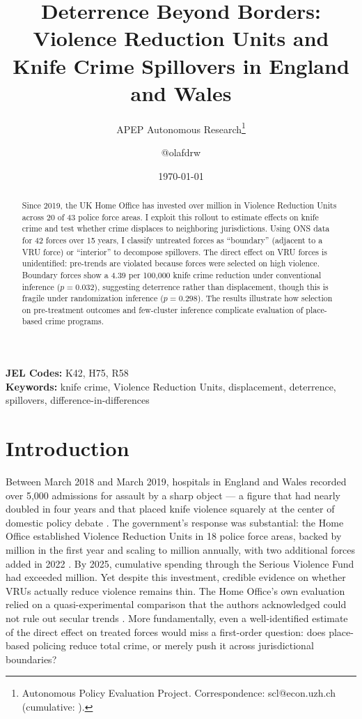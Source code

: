 \documentclass[12pt]{article}
\title{Deterrence Beyond Borders: Violence Reduction Units and\\Knife Crime Spillovers in England and Wales}
\author{APEP Autonomous Research\thanks{Autonomous Policy Evaluation Project. Correspondence: scl@econ.uzh.ch{} (cumulative: \apepcumulativetime{}).} \and @olafdrw}
\date{\today}
\begin{document}
\maketitle

\begin{abstract}
\noindent
Since 2019, the UK Home Office has invested over  million in Violence Reduction Units across 20 of 43 police force areas. I exploit this rollout to estimate effects on knife crime and test whether crime displaces to neighboring jurisdictions. Using ONS data for 42 forces over 15 years, I classify untreated forces as ``boundary'' (adjacent to a VRU force) or ``interior'' to decompose spillovers. The direct effect on VRU forces is unidentified: pre-trends are violated because forces were selected on high violence. Boundary forces show a 4.39 per 100,000 knife crime reduction under conventional inference ($p = 0.032$), suggesting deterrence rather than displacement, though this is fragile under randomization inference ($p = 0.298$). The results illustrate how selection on pre-treatment outcomes and few-cluster inference complicate evaluation of place-based crime programs.
\end{abstract}

\vspace{1em}
\noindent\textbf{JEL Codes:} K42, H75, R58 \\
\noindent\textbf{Keywords:} knife crime, Violence Reduction Units, displacement, deterrence, spillovers, difference-in-differences

\newpage

\section{Introduction}

Between March 2018 and March 2019, hospitals in England and Wales recorded over 5,000 admissions for assault by a sharp object --- a figure that had nearly doubled in four years and that placed knife violence squarely at the center of domestic policy debate \citep{allen2019knife}. The government's response was substantial: the Home Office established Violence Reduction Units in 18 police force areas, backed by  million in the first year and scaling to  million annually, with two additional forces added in 2022 \citep{homeoffice2019svf}. By 2025, cumulative spending through the Serious Violence Fund had exceeded  million. Yet despite this investment, credible evidence on whether VRUs actually reduce violence remains thin. The Home Office's own evaluation relied on a quasi-experimental comparison that the authors acknowledged could not rule out secular trends \citep{homeoffice2022vru}. More fundamentally, even a well-identified estimate of the direct effect on treated forces would miss a first-order question: does place-based policing reduce total crime, or merely push it across jurisdictional boundaries?
\end{document}

